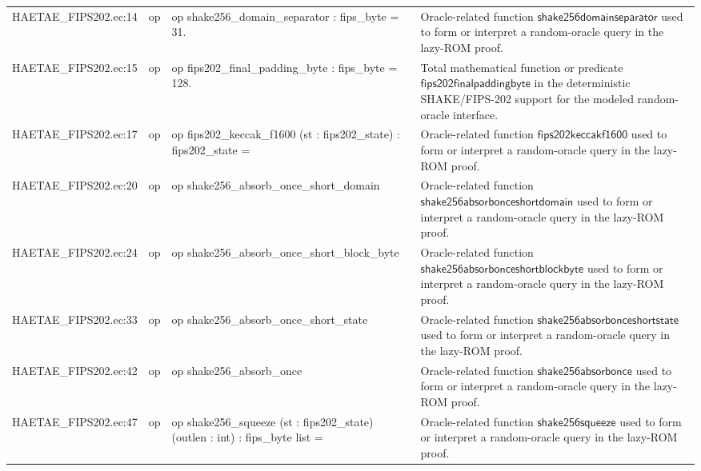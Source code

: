 \documentclass[10pt]{article}
\begin{document}
\begin{longtable}{L{0.11\textwidth}L{0.055\textwidth}L{0.385\textwidth}L{0.41\textwidth}}
HAETAE\_\allowbreak{}FIPS202.\allowbreak{}ec:\allowbreak{}14 & op & {\ttfamily\scriptsize op shake256\_\allowbreak{}domain\_\allowbreak{}separator : fips\_\allowbreak{}byte = 31.} & Oracle-related function $\mathsf{shake256domainseparator}$ used to form or interpret a random-oracle query in the lazy-ROM proof. \\
HAETAE\_\allowbreak{}FIPS202.\allowbreak{}ec:\allowbreak{}15 & op & {\ttfamily\scriptsize op fips202\_\allowbreak{}final\_\allowbreak{}padding\_\allowbreak{}byte : fips\_\allowbreak{}byte = 128.} & Total mathematical function or predicate $\mathsf{fips202finalpaddingbyte}$ in the deterministic SHAKE/FIPS-202 support for the modeled random-oracle interface. \\
HAETAE\_\allowbreak{}FIPS202.\allowbreak{}ec:\allowbreak{}17 & op & {\ttfamily\scriptsize op fips202\_\allowbreak{}keccak\_\allowbreak{}f1600 (st : fips202\_\allowbreak{}state) : fips202\_\allowbreak{}state =} & Oracle-related function $\mathsf{fips202keccakf1600}$ used to form or interpret a random-oracle query in the lazy-ROM proof. \\
HAETAE\_\allowbreak{}FIPS202.\allowbreak{}ec:\allowbreak{}20 & op & {\ttfamily\scriptsize op shake256\_\allowbreak{}absorb\_\allowbreak{}once\_\allowbreak{}short\_\allowbreak{}domain} & Oracle-related function $\mathsf{shake256absorbonceshortdomain}$ used to form or interpret a random-oracle query in the lazy-ROM proof. \\
HAETAE\_\allowbreak{}FIPS202.\allowbreak{}ec:\allowbreak{}24 & op & {\ttfamily\scriptsize op shake256\_\allowbreak{}absorb\_\allowbreak{}once\_\allowbreak{}short\_\allowbreak{}block\_\allowbreak{}byte} & Oracle-related function $\mathsf{shake256absorbonceshortblockbyte}$ used to form or interpret a random-oracle query in the lazy-ROM proof. \\
HAETAE\_\allowbreak{}FIPS202.\allowbreak{}ec:\allowbreak{}33 & op & {\ttfamily\scriptsize op shake256\_\allowbreak{}absorb\_\allowbreak{}once\_\allowbreak{}short\_\allowbreak{}state} & Oracle-related function $\mathsf{shake256absorbonceshortstate}$ used to form or interpret a random-oracle query in the lazy-ROM proof. \\
HAETAE\_\allowbreak{}FIPS202.\allowbreak{}ec:\allowbreak{}42 & op & {\ttfamily\scriptsize op shake256\_\allowbreak{}absorb\_\allowbreak{}once} & Oracle-related function $\mathsf{shake256absorbonce}$ used to form or interpret a random-oracle query in the lazy-ROM proof. \\
HAETAE\_\allowbreak{}FIPS202.\allowbreak{}ec:\allowbreak{}47 & op & {\ttfamily\scriptsize op shake256\_\allowbreak{}squeeze (st : fips202\_\allowbreak{}state) (outlen : int) : fips\_\allowbreak{}byte list =} & Oracle-related function $\mathsf{shake256squeeze}$ used to form or interpret a random-oracle query in the lazy-ROM proof. \\

\end{longtable}
\end{document}

